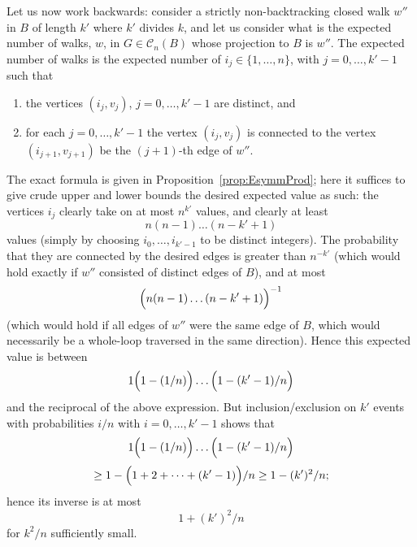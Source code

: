\documentclass{memo-l}
\theoremstyle{plain}
\theoremstyle{definition}
\numberwithin{section}{chapter}
\numberwithin{equation}{chapter}
\theoremstyle{plain}
\theoremstyle{definition}
\newcommand\cC{\mathcal{C}}
\begin{document}
Let us now work backwards: consider a strictly non-backtracking closed walk
$w''$ in $B$ of length $k'$ where $k'$ divides $k$, and let us consider
what is the expected number of walks, $w$, in $G\in\cC_n(B)$ whose
projection to $B$ is $w''$.  The expected number of walks is the 
expected number of $i_j\in\{1,\ldots,n\}$, with $j=0,\ldots,k'-1$
such that
\begin{enumerate}
\item the vertices $(i_j,v_j)$, $j=0,\ldots,k'-1$ are distinct, and
\item for each $j=0,\ldots,k'-1$ the vertex $(i_j,v_j)$ is connected
to the vertex $(i_{j+1},v_{j+1})$ be the $(j+1)$-th edge of $w''$.
\end{enumerate}
The exact formula is given in Proposition~\ref{prop:EsymmProd};
here it suffices to give crude upper and lower
bounds the desired expected value as such:
the vertices $i_j$ clearly take on at most $n^{k'}$ values, and clearly
at least 
$$
n (n-1) \ldots (n-k'+1)
$$
values (simply by choosing $i_0,\ldots,i_{k'-1}$ to be distinct integers).
The probability that they are connected by the desired edges is
greater than $n^{-k'}$ (which would hold exactly if $w''$ consisted of
distinct edges of $B$), and at most
$$
\Bigl( n (n-1) \ldots (n-k'+1) \Bigr)^{-1}
$$
(which would hold if all edges of $w''$ were the same edge of $B$, which
would necessarily be a whole-loop traversed in the same direction).
Hence this expected value is between
$$
1 \Bigl( 1 - (1/n) \Bigr) \ldots \Bigl( 1 - (k'-1)/n \Bigr)
$$
and the reciprocal of the above expression.  But inclusion/exclusion 
on $k'$ events with probabilities $i/n$ with $i=0,\ldots,k'-1$ shows
that 
$$
1 \Bigl( 1 - (1/n) \Bigr) \ldots \Bigl( 1 - (k'-1)/n \Bigr)
$$
$$
\ge 1 - \Bigl(1+2+\cdots + (k'-1)\Bigr)/n  \ge 1 - (k')^2/n;
$$
hence its inverse is at most
$$
1 + (k')^2/n
$$
for $k^2/n$ sufficiently small.
\end{document}
